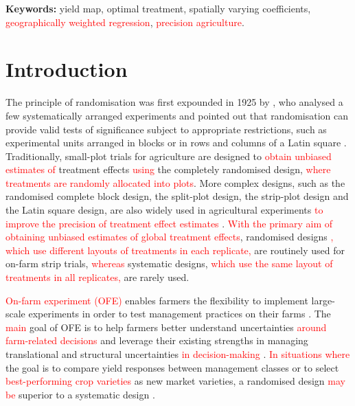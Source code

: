 \documentclass[a4paper]{article} 	%
\newcommand{\revision}[1]{\textcolor{red}{#1}}
\newcommand{\zc}[1]{\textcolor{red}{#1}}
\begin{document}
 
{\bf Keywords:} yield map, optimal treatment, spatially varying coefficients, \revision{geographically weighted regression}, \revision{precision agriculture}. 

\section{Introduction}\label{Sec:Intro}

The principle of randomisation was first expounded in 1925 by \textcite{Fisher1934Statistical}, who analysed a few systematically arranged experiments and pointed out that randomisation can provide valid tests of significance subject to appropriate restrictions, such as experimental units arranged in blocks or in rows and columns of a Latin square \parencite{Verdooren2020History}. Traditionally, small-plot trials for agriculture are designed to \revision{obtain unbiased estimates of} treatment effects \revision{using} the completely randomised design, \zc{where treatments are randomly allocated into plots}. More complex designs, such as the randomised complete block design, the split-plot design, the strip-plot design and the Latin square design, are also widely used in agricultural experiments \revision{to improve the precision of treatment effect estimates} \parencite{Petersen1994Agricultural}. \revision{With the primary aim of obtaining unbiased estimates of global treatment effects}, randomised designs \zc{, which use different layouts of treatments in each replicate,} are routinely used for on-farm strip trials, \revision{whereas} systematic designs, \zc{which use the same layout of treatments in all replicates,} are rarely used.



\revision{On-farm experiment (OFE)} enables farmers the flexibility to implement large-scale experiments in order to test management practices on their farms \parencite{Evans2020Assessment}. The \revision{main} goal of OFE is to help farmers better understand uncertainties \revision{around farm-related decisions} and leverage their existing strengths in managing translational and structural uncertainties \revision{in decision-making} \parencite{Cook2013Onfarm}. \revision{In situations where} the goal is to compare yield responses between management classes or to select \revision{best-performing crop varieties} as new market varieties, a randomised design \revision{may be} superior to a systematic design \parencite{Pringle2004FieldScale, Selle2019Flexible}. 
\end{document}
